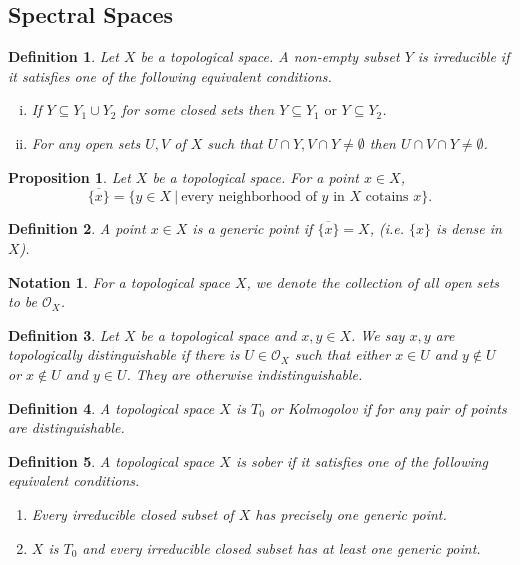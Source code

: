 \documentclass[8pt]{article}
\numberwithin{equation}{section}
\newtheorem{proposition}{Proposition}[subsection]
\newtheorem{definition}{Definition}[subsection]
\newtheorem{notation}{Notation}[subsection]
\newcommand{\Ouv}{\mathscr{O}}
\newcommand{\sep}[0]{\:|\:}
\newcommand{\tor}[0]{\text{ or }}
\begin{document}
\subsection{Spectral Spaces}
\begin{definition}
    Let $X$ be a topological space. A non-empty subset $Y$ is irreducible if it satisfies one of the following equivalent conditions.
    \begin{enumerate}[i.]
        \item If $Y\subseteq Y_1\cup Y_2$ for some closed sets then $Y\subseteq Y_1 \tor Y\subseteq Y_2$.
        \item For any open sets $U,V$ of $X$ such that $U\cap Y,V\cap Y\not=\emptyset$ then $U\cap V\cap Y\not=\emptyset$.
    \end{enumerate}
\end{definition}
\begin{proposition}
    Let $X$ be a topological space. For a point $x\in X$, 
    \begin{equation*}
        \overline{\{x\}} = \{ y \in X\sep \text{every neighborhood of $y$ in $X$ cotains $x$}\}.
    \end{equation*}
\end{proposition}
\begin{definition}
    A point $x\in X$ is a generic point if $\overline{\{x\}} = X$, (i.e. $\{x\}$ is dense in $X$).
\end{definition}
\begin{notation}
    For a topological space $X$, we denote the collection of all open sets to be $\Ouv_X$.
\end{notation}
\begin{definition}
    \label{definition_1}
    Let $X$ be a topological space and $x,y\in X$. We say $x,y$ are topologically distinguishable if there is $U\in\Ouv_X$ such that either $x\in U$ and $y\not\in U$ or $x\not\in U$ and $y\in U$. They are otherwise indistinguishable. 
\end{definition}
\begin{definition}
    A topological space $X$ is $T_0$ or Kolmogolov if for any pair of points are distinguishable.
\end{definition}
\begin{definition}
    \label{definition_2}
    A topological space $X$ is sober if it satisfies one of the following equivalent conditions.
    \begin{enumerate}[1.]
        \item Every irreducible closed subset of $X$ has precisely one generic point.
        \item $X$ is $T_0$ and every irreducible closed subset has at least one generic point.
    \end{enumerate}
\end{definition}
\end{document}
